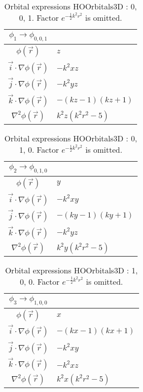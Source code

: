 \begin{table}
\begin{center}
\begin{tabular}{c|l}
$\phi_{1} \rightarrow \phi_{0, 0, 1}$\\
\hline
$\phi(\vec r)$ & $z$\\
\hline
$\vec i\cdot \nabla \phi(\vec r)$ & $- k^{2} x z$\\
$\vec j\cdot \nabla \phi(\vec r)$ & $- k^{2} y z$\\
$\vec k\cdot \nabla \phi(\vec r)$ & $- \left(k z -1\right) \left(k z + 1\right)$\\
\hline
$\nabla^2 \phi(\vec r)$ & $k^{2} z \left(k^{2} r^{2} -5\right)$\\
\end{tabular}
\caption{Orbital expressions HOOrbitals3D : 0, 0, 1. Factor $e^{- \frac{1}{2} k^{2} r^{2}}$ is omitted.}
\end{center}
\end{table}


\begin{table}
\begin{center}
\begin{tabular}{c|l}
$\phi_{2} \rightarrow \phi_{0, 1, 0}$\\
\hline
$\phi(\vec r)$ & $y$\\
\hline
$\vec i\cdot \nabla \phi(\vec r)$ & $- k^{2} x y$\\
$\vec j\cdot \nabla \phi(\vec r)$ & $- \left(k y -1\right) \left(k y + 1\right)$\\
$\vec k\cdot \nabla \phi(\vec r)$ & $- k^{2} y z$\\
\hline
$\nabla^2 \phi(\vec r)$ & $k^{2} y \left(k^{2} r^{2} -5\right)$\\
\end{tabular}
\caption{Orbital expressions HOOrbitals3D : 0, 1, 0. Factor $e^{- \frac{1}{2} k^{2} r^{2}}$ is omitted.}
\end{center}
\end{table}


\begin{table}
\begin{center}
\begin{tabular}{c|l}
$\phi_{3} \rightarrow \phi_{1, 0, 0}$\\
\hline
$\phi(\vec r)$ & $x$\\
\hline
$\vec i\cdot \nabla \phi(\vec r)$ & $- \left(k x -1\right) \left(k x + 1\right)$\\
$\vec j\cdot \nabla \phi(\vec r)$ & $- k^{2} x y$\\
$\vec k\cdot \nabla \phi(\vec r)$ & $- k^{2} x z$\\
\hline
$\nabla^2 \phi(\vec r)$ & $k^{2} x \left(k^{2} r^{2} -5\right)$\\
\end{tabular}
\caption{Orbital expressions HOOrbitals3D : 1, 0, 0. Factor $e^{- \frac{1}{2} k^{2} r^{2}}$ is omitted.}
\end{center}
\end{table}


